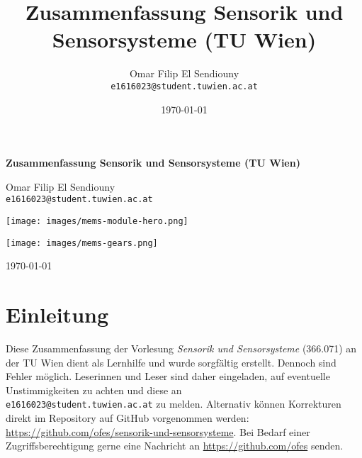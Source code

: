 \documentclass{article} %
\title{Zusammenfassung Sensorik und Sensorsysteme (TU Wien)}
\author{Omar Filip El Sendiouny \\ \texttt{e1616023@student.tuwien.ac.at}}
\date{\today}
\begin{document}
\begin{titlepage}
    \centering
    \vspace{2cm}
    {\Huge \bfseries Zusammenfassung Sensorik und Sensorsysteme (TU Wien) \par}
    
    \vspace{1cm}
    {\Large Omar Filip El Sendiouny \\ \texttt{e1616023@student.tuwien.ac.at} \par}

    \vspace*{2cm}

    \texttt{[image: images/mems-module-hero.png]}
    
    \texttt{[image: images/mems-gears.png]} 

    \vspace*{2cm} 
    
    \vfill
    
    {\large \today \par}
\end{titlepage}

\tableofcontents
\listoftables
\listoffigures
\thispagestyle{empty}
\newpage






\section*{Einleitung} %

Diese Zusammenfassung der Vorlesung \textit{Sensorik und Sensorsysteme} (366.071) an der TU Wien dient als Lernhilfe und wurde sorgfältig erstellt. Dennoch sind Fehler möglich. Leserinnen und Leser sind daher eingeladen, auf eventuelle Unstimmigkeiten zu achten und diese an \\ \texttt{e1616023@student.tuwien.ac.at} zu melden. Alternativ können Korrekturen direkt im Repository auf GitHub vorgenommen werden: \\ \url{https://github.com/ofes/sensorik-und-sensorsysteme}. Bei Bedarf einer Zugriffsberechtigung gerne eine Nachricht an \url{https://github.com/ofes} senden.
\end{document}
